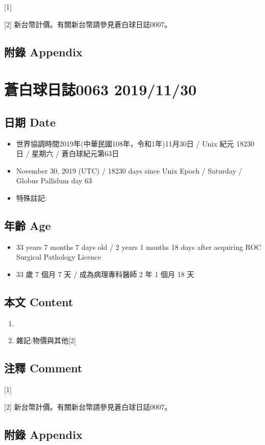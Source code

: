 \documentclass[
]{article}
\providecommand{\tightlist}{%
  \setlength{\itemsep}{0pt}\setlength{\parskip}{0pt}}
\begin{document}
{[}1{]}

{[}2{]} 新台幣計價。有關新台幣請參見蒼白球日誌0007。

\hypertarget{ux9644ux9304-appendix-28}{%
\subsection{附錄 Appendix}\label{ux9644ux9304-appendix-28}}

\hypertarget{ux84bcux767dux7403ux65e5ux8a8c0063-20191130}{%
\section{蒼白球日誌0063
2019/11/30}\label{ux84bcux767dux7403ux65e5ux8a8c0063-20191130}}

\hypertarget{ux65e5ux671f-date-29}{%
\subsection{日期 Date}\label{ux65e5ux671f-date-29}}

\begin{itemize}
\tightlist
\item
  世界協調時間2019年(中華民國108年，令和1年)11月30日 / Unix 紀元 18230
  日 / 星期六 / 蒼白球紀元第63日
\item
  November 30, 2019 (UTC) / 18230 days since Unix Epoch / Saturday /
  Globus Pallidum day 63
\item
  特殊註記:
\end{itemize}

\hypertarget{ux5e74ux9f61-age-29}{%
\subsection{年齡 Age}\label{ux5e74ux9f61-age-29}}

\begin{itemize}
\tightlist
\item
  33 years 7 months 7 days old / 2 years 1 months 18 days after
  acquiring ROC Surgical Pathology Licence
\item
  33 歲 7 個月 7 天 / 成為病理專科醫師 2 年 1 個月 18 天
\end{itemize}

\hypertarget{ux672cux6587-content-29}{%
\subsection{本文 Content}\label{ux672cux6587-content-29}}

\begin{enumerate}
\def\labelenumi{\arabic{enumi}.}
\item
\item
  雜記:物價與其他{[}2{]}
\end{enumerate}

\hypertarget{ux6ce8ux91cb-comment-29}{%
\subsection{注釋 Comment}\label{ux6ce8ux91cb-comment-29}}

{[}1{]}

{[}2{]} 新台幣計價。有關新台幣請參見蒼白球日誌0007。

\hypertarget{ux9644ux9304-appendix-29}{%
\subsection{附錄 Appendix}\label{ux9644ux9304-appendix-29}}
\end{document}
